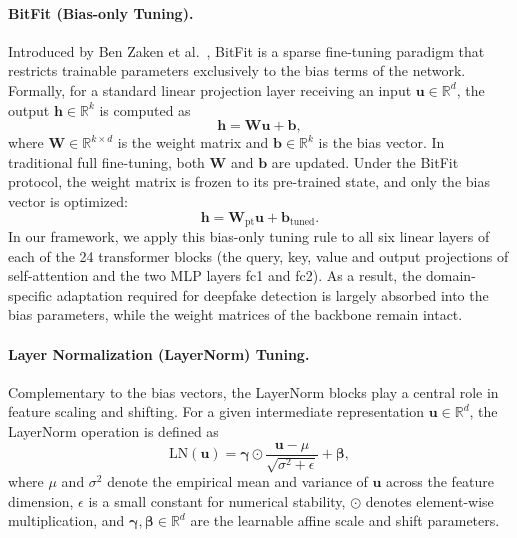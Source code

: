 \documentclass[fonts]{icst}
\newif\ifrevmark\revmarkfalse
\newcommand{\rev}[1]{\ifrevmark{\color{revblue}#1}\else#1\fi}
\begin{document}
\paragraph{BitFit (Bias-only Tuning).}
Introduced by Ben Zaken et al.~\cite{benzaken2022bitfit}, BitFit is a sparse fine-tuning paradigm that restricts trainable parameters exclusively to the bias terms of the network.
Formally, for a standard linear projection layer receiving an input $\mathbf{u} \in \mathbb{R}^{d}$, the output $\mathbf{h} \in \mathbb{R}^{k}$ is computed as
\begin{equation}
    \mathbf{h} = \mathbf{W}\mathbf{u} + \mathbf{b},
\end{equation}
where $\mathbf{W} \in \mathbb{R}^{k \times d}$ is the weight matrix and $\mathbf{b} \in \mathbb{R}^{k}$ is the bias vector.
In traditional full fine-tuning, both $\mathbf{W}$ and $\mathbf{b}$ are updated.
Under the BitFit protocol, the weight matrix is frozen to its pre-trained state, and only the bias vector is optimized:
\begin{equation}
    \mathbf{h} = \mathbf{W}_{\text{pt}}\mathbf{u} + \mathbf{b}_{\text{tuned}}.
\end{equation}
In our framework, we apply this bias-only tuning rule \rev{to all six linear layers of each of the 24 transformer blocks (the query, key, value and output projections of self-attention and the two MLP layers fc1 and fc2)}.
As a result, the domain-specific adaptation required for deepfake detection is largely absorbed into the bias parameters, while the \rev{weight matrices} of the backbone remain intact.

\paragraph{Layer Normalization (LayerNorm) Tuning.}
Complementary to the bias vectors, the LayerNorm blocks play a central role in feature scaling and shifting.
For a given intermediate representation $\mathbf{u} \in \mathbb{R}^{d}$, the LayerNorm operation is defined as
\begin{equation}
    \mathrm{LN}(\mathbf{u}) = \boldsymbol{\gamma} \odot \frac{\mathbf{u} - \mu}{\sqrt{\sigma^2 + \epsilon}} + \boldsymbol{\beta},
\end{equation}
where $\mu$ and $\sigma^2$ denote the empirical mean and variance of $\mathbf{u}$ across the feature dimension, $\epsilon$ is a small constant for numerical stability, $\odot$ denotes element-wise multiplication, and $\boldsymbol{\gamma}, \boldsymbol{\beta} \in \mathbb{R}^{d}$ are the learnable affine scale and shift parameters.
\end{document}
